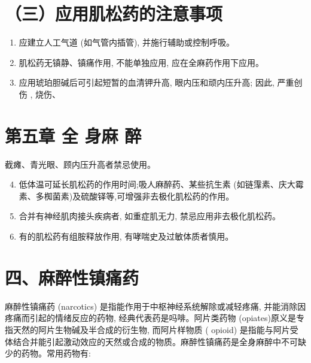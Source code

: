 \documentclass[10pt]{article}
\begin{document}
\section*{（三）应用肌松药的注意事项}
\begin{enumerate}
  \item 应建立人工气道 (如气管内插管), 并施行辅助或控制呼吸。

  \item 肌松药无镇静、镇痛作用, 不能单独应用, 应在全麻药作用下应用。

  \item 应用琥珀胆碱后可引起短暂的血清钾升高, 眼内压和顽内压升高; 因此, 严重创伤 , 烧伤、

\end{enumerate}

\section*{第五章 全 身麻 醉}
截瘫、青光眼、顾内压升高者禁忌使用。

\begin{enumerate}
  \setcounter{enumi}{3}
  \item 低体温可延长肌松药的作用时间;吸人麻醉药、某些抗生素 (如链䨰素、庆大霉素、多椥菌素)及硫酸铎等,可增强非去极化肌松药的作用。

  \item 合并有神经肌肉接头疾病者, 如重症肌无力, 禁忌应用非去极化肌松药。

  \item 有的肌松药有组胺释放作用, 有哮喘史及过敏体质者慎用。

\end{enumerate}

\section*{四、麻醉性镇痛药}
麻醉性镇痛药 (narcotics) 是指能作用于中枢神经系统解除或减轻疼痛, 并能消除因疼痛而引起的情绪反应的药物, 经典代表药是吗啡。阿片类药物 (opiates)原义是专指天然的阿片生物碱及半合成的衍生物, 而阿片样物质 ( opioid) 是指能与阿片受体结合并能引起激动效应的天然或合成的物质。麻醉性镇痛药是全身麻醉中不可缺少的药物。常用药物有:
\end{document}
